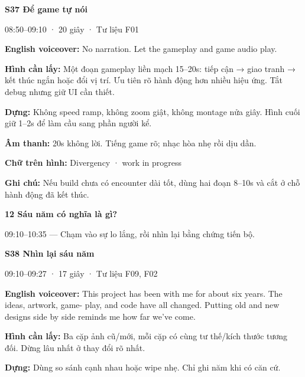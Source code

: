 \documentclass[10pt,a4paper]{article}
\begin{document}
\textbf{S37 Để game tự nói}\par

08:50–09:10 · 20 giây · Tư liệu F01\par

\textbf{English voiceover:}  No narration. Let the gameplay and game audio play.\par

\textbf{Hình cần lấy:}  Một đoạn gameplay liền mạch 15–20s: tiếp cận → giao tranh → kết thúc ngắn hoặc đổi vị trí. Ưu tiên rõ hành động hơn nhiều hiệu ứng. Tắt debug nhưng giữ UI cần thiết.\par

\textbf{Dựng:}  Không speed ramp, không zoom giật, không montage nửa giây. Hình cuối giữ 1–2s để làm cầu sang phần người kể.\par

\textbf{Âm thanh:}  20s không lời. Tiếng game rõ; nhạc hòa nhẹ rồi dịu dần.\par

\textbf{Chữ trên hình:}  Divergency · work in progress\par

\textbf{Ghi chú:}  Nếu build chưa có encounter dài tốt, dùng hai đoạn 8–10s và cắt ở chỗ hành động đã kết thúc.\par

\textbf{12 Sáu năm có nghĩa là gì?}\par

09:10–10:35 — Chạm vào sự lo lắng, rồi nhìn lại bằng chứng tiến bộ.\par

\textbf{S38 Nhìn lại sáu năm}\par

09:10–09:27 · 17 giây · Tư liệu F09, F02\par

\textbf{English voiceover:}  This project has been with me for about six years. The ideas, artwork, game- play, and code have all changed. Putting old and new designs side by side reminds me how far we’ve come.\par

\textbf{Hình cần lấy:}  Ba cặp ảnh cũ/mới, mỗi cặp có cùng tư thế/kích thước tương đối. Dừng lâu nhất ở thay đổi rõ nhất.\par

\textbf{Dựng:}  Dùng so sánh cạnh nhau hoặc wipe nhẹ. Chỉ ghi năm khi có căn cứ.\par
\end{document}
